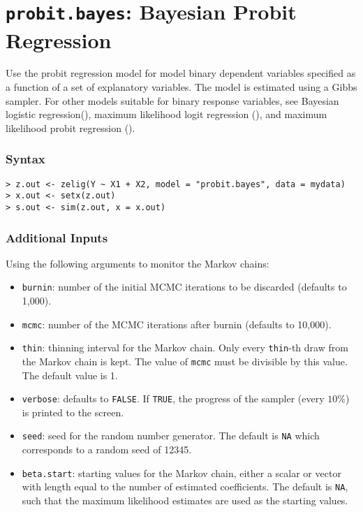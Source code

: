 \section{\texttt{probit.bayes}: Bayesian Probit Regression}

\label{probit.bayes}

Use the probit regression model for model binary dependent variables
specified as a function of a set of explanatory variables.  The model
is estimated using a Gibbs sampler.  For other models suitable for
binary response variables, see Bayesian logistic
regression(), maximum likelihood logit regression
(), and maximum likelihood probit regression
().  

\subsubsection{Syntax}
\begin{verbatim}
> z.out <- zelig(Y ~ X1 + X2, model = "probit.bayes", data = mydata)
> x.out <- setx(z.out)
> s.out <- sim(z.out, x = x.out)
\end{verbatim}

\subsubsection{Additional Inputs}

Using the following arguments to monitor the Markov chains:  
\begin{itemize}
\item \texttt{burnin}: number of the initial MCMC iterations to be 
 discarded (defaults to 1,000).

\item \texttt{mcmc}: number of the MCMC iterations after burnin
(defaults to 10,000).

\item \texttt{thin}: thinning interval for the Markov chain. Only every 
 \texttt{thin}-th draw from the Markov chain is kept. The value of 
\texttt{mcmc} must be divisible by this value. The default value is 1.

\item \texttt{verbose}: defaults to {\tt FALSE}.  If \texttt{TRUE},
the progress of the sampler (every $10\%$) is printed to the screen.

\item \texttt{seed}: seed for the random number generator. The default is 
\texttt{NA} which corresponds to a random seed of 12345. 

\item \texttt{beta.start}: starting values for the Markov 
chain, either a scalar or vector with length equal to the number of
estimated coefficients. The default is \texttt{NA}, such that the
maximum likelihood estimates are used as the starting values.

\end{itemize}


